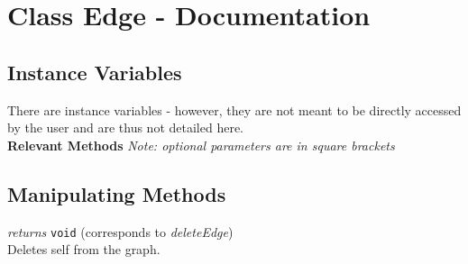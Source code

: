 \section{Class Edge - Documentation}

\subsection{Instance Variables}
There are instance variables - however, they are not meant to be directly accessed by the user and are thus not detailed here.\\

\textbf{{\large Relevant Methods}}
\textit{Note: optional parameters are in square brackets}
\subsection{Manipulating Methods}
\begin{description}
\label{deleteEdgeClass}\item[delete()] \emph{returns} \texttt{void} (corresponds to \textit{deleteEdge})\\
Deletes self from the graph.



\end{description}
